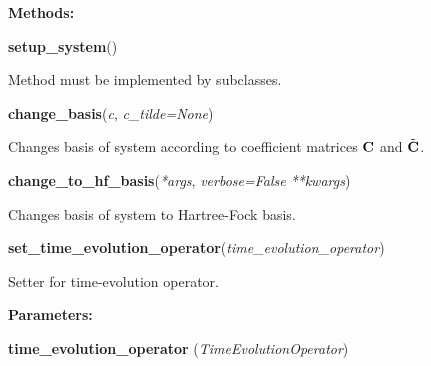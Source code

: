 \begin{tcolorbox}
{    \vspace{1em}
    \textbf{Methods:}

    \hspace{2em} \textbf{setup\_system}()
    \begin{adjustwidth}{4em}{}
        Method must be implemented by subclasses.
    \end{adjustwidth}

    \hspace{2em} \textbf{change\_basis}(\emph{c}, \emph{c\_tilde=None})
    \begin{adjustwidth}{4em}{}
        Changes basis of system according to coefficient matrices $\vb{C}$
        and $\tilde{\vb{C}}$.
    \end{adjustwidth}

    \hspace{2em} \textbf{change\_to\_hf\_basis}(\emph{*args}, \emph{verbose=False} \emph{**kwargs})
    \begin{adjustwidth}{4em}{}
        Changes basis of system to Hartree-Fock basis.
    \end{adjustwidth}

    \hspace{2em} \textbf{set\_time\_evolution\_operator}(\emph{time\_evolution\_operator})
    \begin{adjustwidth}{4em}{}
        Setter for time-evolution operator.

        \textbf{Parameters:} 
        
        \hspace{1.5em} \textbf{time\_evolution\_operator} (\emph{TimeEvolutionOperator}) 

    \end{adjustwidth}

    }
\end{tcolorbox}